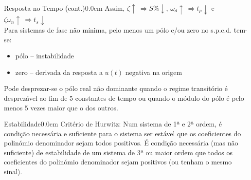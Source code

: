 \documentclass[portuguese,10pt,3col]{cheatsheet}
\begin{document}
\begin{multicols}{3}
\begin{cheatsheetbox}{Resposta no Tempo (cont.)}{0.0cm}
    Assim, $\zeta \uparrow \ \Rightarrow S\% \downarrow$, $\omega_d \uparrow \ \Rightarrow t_p \downarrow$ e $\zeta\omega_n \uparrow \ \Rightarrow t_s \downarrow$\\
    
    Para sistemas de fase não mínima, pelo menos um pólo e/ou zero no s.p.c.d. tem-se:
    \begin{itemize}
        \item pólo -- instabilidade
        \item zero -- derivada da resposta a $u(t)$ negativa na origem 
    \end{itemize}
    
    Pode desprezar-se o pólo real não dominante quando o regime transitório é desprezável ao fim de 5 constantes de tempo ou quando o módulo do pólo é pelo menos 5 vezes maior que o dos outros.
\end{cheatsheetbox}

\begin{cheatsheetbox}{Estabilidade}{0.0cm}
    Critério de Hurwitz: Num sistema de 1ª e 2ª ordem, é condição necessária e suficiente para o sistema ser estável que os coeficientes do polinómio denominador sejam todos positivos. É condição necessária (mas não suficiente) de estabilidade de um sistema de 3ª ou maior ordem que todos os coeficientes do polinómio denominador sejam positivos (ou tenham o mesmo sinal).
\end{cheatsheetbox}


\end{multicols}
\end{document}
